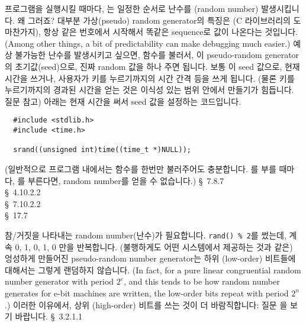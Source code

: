 \begin{faq}
	프로그램을 실행시킬 때마다, 는 일정한 순서로 난수를
	(random number)	발생시킵니다.  왜 그러죠?
\A
	대부분 가상(pseudo) random generator의 특징은 (C 라이브러리의
        도 마찬가지), 항상 같은 번호에서 시작해서 똑같은 sequence로
        값이 나온다는 것입니다. (Among other things, a bit of predictability
        can make debugging much easier.) 
	예상 불가능한 난수를 발생시키고 싶으면,  함수를 불러서,
        이 pseudo-random generator의 초기값(seed)으로, 진짜 random 값을 하나
        주면 됩니다. 보통 이 seed 값으로, 현재 시간을 쓰거나, 사용자가 키를
        누르기까지의 시간 간격 등을 쓰게 됩니다. (물론 키를 누르기까지의
        경과된 시간을 얻는 것은 이식성 있는 범위 안에서 만들기가 힘듭니다.
        질문  참고)  아래는 현재 시간을 써서 seed 값을 설정하는
        코드입니다.
\begin{verbatim}
  #include <stdlib.h>
  #include <time.h>

  srand((unsigned int)time((time_t *)NULL));
\end{verbatim}

	\noindent (일반적으로 프로그램 내에서는  함수를
	한번만 불러주어도 충분합니다.  를 부를 때마다,
	를 부른다면, random number를 얻을 수 없습니다.)
\R
	\cite{kr2} \S\ 7.8.7  \\
        \cite{ansi} \S\ 4.10.2.2 \\
	\cite{c89} \S\ 7.10.2.2 \\
	\cite{hs} \S\ 17.7 
\end{faq}

\begin{faq}
	참/거짓을 나타내는 random number(난수)가 필요합니다. 
	\verb+rand() % 2+를 썼는데, 계속 0, 1, 0, 1, 0 만을 반복합니다.
\A
	(불행하게도 어떤 시스템에서 제공하는 것과 같은) 엉성하게 만들어진 
	pseudo-random number generator는 하위 (low-order) 비트들에 대해서는 
        그렇게 랜덤하지 않습니다.
        (In fact, for a pure linear congruential random number generator
        with period $2^e$, and this tends to be how random number generates
        for e-bit machines are written, the low-order  bits repeat
        with period $2^n$.) 이러한 이유에서,
	상위 (high-order) 비트를 쓰는 것이 더 바람직합니다:
        질문 을 보기 바랍니다.
\R
	\cite{knuth} \S\ 3.2.1.1 
\end{faq}

